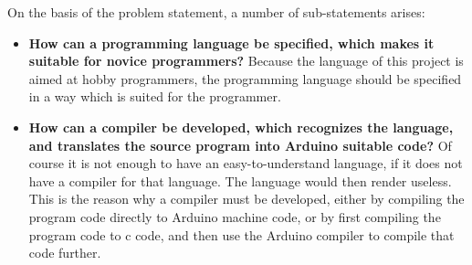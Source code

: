 On the basis of the problem statement, a number of sub-statements arises:
\begin{itemize}
	\item \textbf{How can a programming language be specified, which makes it suitable for novice programmers?} Because the language of this project is aimed at hobby programmers, the programming language should be specified in a way which is suited for the programmer.
	\item \textbf{How can a compiler be developed, which recognizes the language, and translates the source program into Arduino suitable code?} Of course it is not enough to have an easy-to-understand language, if it does not have a compiler for that language. The language would then render useless. This is the reason why a compiler must be developed, either by compiling the program code directly to Arduino machine code, or by first compiling the program code to c code, and then use the Arduino compiler to compile that code further. 
\end{itemize}